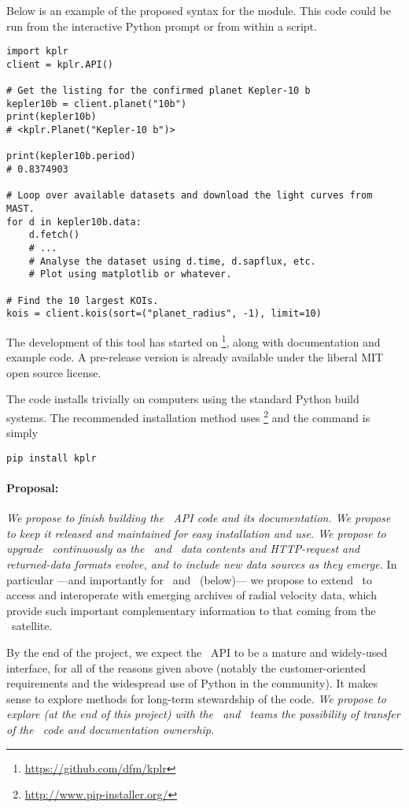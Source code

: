 \documentclass[letterpaper,12pt,preprint]{hack_aastex}
\newcommand{\kplr}{\package{kplr}}
\newcommand{\Bart}{\package{Bart}}
\newcommand{\TheCreator}{\package{TheCreator}}
\begin{document}
Below is an example of the proposed syntax for the module.
This code could be run from the interactive Python prompt or from within a
script.
\begin{lstlisting}
import kplr
client = kplr.API()

# Get the listing for the confirmed planet Kepler-10 b
kepler10b = client.planet("10b")
print(kepler10b)
# <kplr.Planet("Kepler-10 b")>

print(kepler10b.period)
# 0.8374903

# Loop over available datasets and download the light curves from MAST.
for d in kepler10b.data:
    d.fetch()
    # ...
    # Analyse the dataset using d.time, d.sapflux, etc.
    # Plot using matplotlib or whatever.

# Find the 10 largest KOIs.
kois = client.kois(sort=("planet_radius", -1), limit=10)
\end{lstlisting}

The development of this tool has started on %
\footnote{\url{https://github.com/dfm/kplr}},
along with documentation and example code.
A pre-release version is already available under the liberal MIT open source
license.

The code installs trivially on computers using the standard Python build
systems. The recommended installation method uses \footnote{%
\url{http://www.pip-installer.org/}} and the command is simply
\begin{lstlisting}
pip install kplr
\end{lstlisting}

\paragraph{Proposal:}
\emph{We propose to finish building the \kplr\ API code and its documentation.
We propose to keep it released and maintained for easy installation and use.
We propose to upgrade \kplr\ continuously as the \MAST\ and \EA\ data contents and
HTTP-request and returned-data formats evolve,
and to include new data sources as they emerge.}
In particular%
---and importantly for \Bart\ and \TheCreator\ (below)---%
we propose to extend \kplr\ to access and interoperate with
emerging archives of radial velocity data,
which provide such important complementary information to that coming from
the \Kepler\ satellite.

By the end of the project,
we expect the \kplr\ API to be a mature and widely-used interface,
for all of the reasons given above
 (notably the customer-oriented requirements and the widespread use of Python
in the community).
It makes sense to explore methods for long-term stewardship of the code.
\emph{We propose to explore (at the end of this project) with the \MAST\ and \EA\ teams the possibility of
transfer of the \kplr\ code and documentation ownership.}
\end{document}
